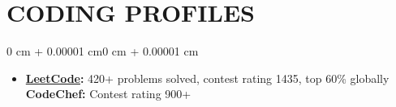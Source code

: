 \documentclass[1pt, letterpaper]{article}
\newenvironment{onecolentry}{
    \begin{adjustwidth}{0 cm + 0.00001 cm}{0 cm + 0.00001 cm}
}{
    \end{adjustwidth}
}
\begin{document}
    \vspace{-1pt}

    \section{CODING PROFILES}
    \begin{onecolentry}
        \begin{itemize}
            \item \textbf{\href{https://leetcode.com/u/madheshcode7/}{LeetCode}:} 420+ problems solved, contest rating 1435, top 60\% globally \hspace{6pt} \textbf{CodeChef:} Contest rating 900+
        \end{itemize}
    \end{onecolentry}
\end{document}
